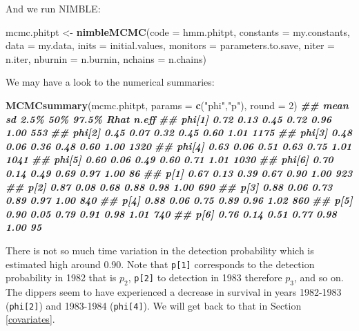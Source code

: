 \documentclass[
  12pt,
]{krantz}
\newenvironment{Shaded}{\begin{snugshade}}{\end{snugshade}}
\newcommand{\AttributeTok}[1]{\textcolor[rgb]{0.13,0.29,0.53}{#1}}
\newcommand{\DecValTok}[1]{\textcolor[rgb]{0.00,0.00,0.81}{#1}}
\newcommand{\DocumentationTok}[1]{\textcolor[rgb]{0.56,0.35,0.01}{\textbf{\textit{#1}}}}
\newcommand{\FunctionTok}[1]{\textcolor[rgb]{0.13,0.29,0.53}{\textbf{#1}}}
\newcommand{\NormalTok}[1]{#1}
\newcommand{\OtherTok}[1]{\textcolor[rgb]{0.56,0.35,0.01}{#1}}
\newcommand{\StringTok}[1]{\textcolor[rgb]{0.31,0.60,0.02}{#1}}
\begin{document}
And we run NIMBLE:

\begin{Shaded}
\begin{Highlighting}[]
\NormalTok{mcmc.phitpt }\OtherTok{\textless{}{-}} \FunctionTok{nimbleMCMC}\NormalTok{(}\AttributeTok{code =}\NormalTok{ hmm.phitpt,}
                          \AttributeTok{constants =}\NormalTok{ my.constants,}
                          \AttributeTok{data =}\NormalTok{ my.data,}
                          \AttributeTok{inits =}\NormalTok{ initial.values,}
                          \AttributeTok{monitors =}\NormalTok{ parameters.to.save,}
                          \AttributeTok{niter =}\NormalTok{ n.iter,}
                          \AttributeTok{nburnin =}\NormalTok{ n.burnin,}
                          \AttributeTok{nchains =}\NormalTok{ n.chains)}
\end{Highlighting}
\end{Shaded}

We may have a look to the numerical summaries:

\begin{Shaded}
\begin{Highlighting}[]
\FunctionTok{MCMCsummary}\NormalTok{(mcmc.phitpt, }\AttributeTok{params =} \FunctionTok{c}\NormalTok{(}\StringTok{"phi"}\NormalTok{,}\StringTok{"p"}\NormalTok{), }\AttributeTok{round =} \DecValTok{2}\NormalTok{)}
\DocumentationTok{\#\#        mean   sd 2.5\%  50\% 97.5\% Rhat n.eff}
\DocumentationTok{\#\# phi[1] 0.72 0.13 0.45 0.72  0.96 1.00   553}
\DocumentationTok{\#\# phi[2] 0.45 0.07 0.32 0.45  0.60 1.01  1175}
\DocumentationTok{\#\# phi[3] 0.48 0.06 0.36 0.48  0.60 1.00  1320}
\DocumentationTok{\#\# phi[4] 0.63 0.06 0.51 0.63  0.75 1.01  1041}
\DocumentationTok{\#\# phi[5] 0.60 0.06 0.49 0.60  0.71 1.01  1030}
\DocumentationTok{\#\# phi[6] 0.70 0.14 0.49 0.69  0.97 1.00    86}
\DocumentationTok{\#\# p[1]   0.67 0.13 0.39 0.67  0.90 1.00   923}
\DocumentationTok{\#\# p[2]   0.87 0.08 0.68 0.88  0.98 1.00   690}
\DocumentationTok{\#\# p[3]   0.88 0.06 0.73 0.89  0.97 1.00   840}
\DocumentationTok{\#\# p[4]   0.88 0.06 0.75 0.89  0.96 1.02   860}
\DocumentationTok{\#\# p[5]   0.90 0.05 0.79 0.91  0.98 1.01   740}
\DocumentationTok{\#\# p[6]   0.76 0.14 0.51 0.77  0.98 1.00    95}
\end{Highlighting}
\end{Shaded}

There is not so much time variation in the detection probability which is estimated high around 0.90. Note that \texttt{p{[}1{]}} corresponds to the detection probability in 1982 that is \(p_2\), \texttt{p{[}2{]}} to detection in 1983 therefore \(p_3\), and so on. The dippers seem to have experienced a decrease in survival in years 1982-1983 (\texttt{phi{[}2{]}}) and 1983-1984 (\texttt{phi{[}4{]}}). We will get back to that in Section \ref{covariates}.
\end{document}
